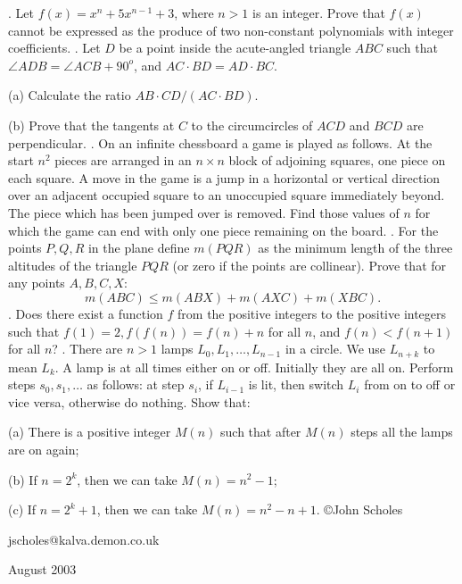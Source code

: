 \nopagenumbers
{}
\vskip 25pt
. Let $f(x)=x^n+5x^{n-1}+3$, where $n>1$ is an integer. Prove that $f(x)$ cannot be expressed as the produce of two non-constant polynomials with integer coefficients.
\vskip 12pt
. Let $D$ be a point inside the acute-angled triangle $ABC$ such that $\angle ADB=\angle ACB+90^o$, and $AC\cdot BD=AD\cdot BC$.

(a) Calculate the ratio $AB\cdot CD/(AC\cdot BD)$.

(b) Prove that the tangents at $C$ to the circumcircles of $ACD$ and $BCD$ are perpendicular.
\vskip 12pt
. On an infinite chessboard a game is played as follows. At the start $n^2$ pieces are arranged in an $n\times n$ block of adjoining squares, one piece on each square. A move in the game is a jump in a horizontal or vertical direction over an adjacent occupied square to an unoccupied square immediately beyond. The piece which has been jumped over is removed. Find those values of $n$ for which the game can end with only one piece remaining on the board.
\vskip 12pt
. For the points $P,Q,R$ in the plane define $m(PQR)$ as the minimum length of the three altitudes of the triangle $PQR$ (or zero if the points are collinear). Prove that for any points $A,B,C,X$: $$m(ABC)\le m(ABX)+m(AXC)+m(XBC).$$
\vskip 12pt
. Does there exist a function $f$ from the positive integers to the positive integers such that $f(1)=2,f(f(n))=f(n)+n$ for all $n$, and $f(n)<f(n+1)$ for all $n$?
\vskip 12pt
. There are $n>1$ lamps $L_0,L_1,\ldots ,L_{n-1}$ in a circle. We use $L_{n+k}$ to mean $L_k$. A lamp is at all times either on or off. Initially they are all on. Perform steps $s_0,s_1,\ldots$ as follows: at step $s_i$, if $L_{i-1}$ is lit, then switch $L_i$ from on to off or vice versa, otherwise do nothing. Show that:

(a) There is a positive integer $M(n)$ such that after $M(n)$ steps all the lamps are on again;

(b) If $n=2^k$, then we can take $M(n)=n^2-1$;

(c) If $n=2^k+1$, then we can take $M(n)=n^2-n+1$.
\vskip 20pt
\noindent \copyright John Scholes

\noindent jscholes@kalva.demon.co.uk

 August 2003

\bye
